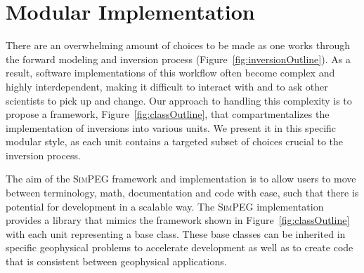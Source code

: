 \documentclass[preprint,review,3p,times,onecolumn,authoryear]{elsarticle}
\newcommand{\SimPEG}{\textsc{SimPEG}\xspace}
\begin{document}

\section{Modular Implementation}
\label{sec:implementation}

There are an overwhelming amount of choices to be made as one works through the forward
modeling and inversion process (Figure~\ref{fig:inversionOutline}). As a result,
software implementations of this workflow often become
complex and highly interdependent, making it difficult to interact with and to
ask other scientists to pick up and change.
Our approach to handling this complexity is to propose a framework,
Figure~\ref{fig:classOutline}, that compartmentalizes the implementation of
inversions into various units.
We present it in this specific modular style, as each unit contains
a targeted subset of choices crucial to the inversion process.

The aim of the \SimPEG framework and implementation
is to
allow users to move between terminology, math, documentation and
code with ease, such that there is potential for development in a scalable way.
The \SimPEG implementation provides a library that mimics the framework shown in Figure~\ref{fig:classOutline} with each unit representing a base class.
These base classes can be inherited in specific geophysical problems to accelerate development
as well as to create code that is consistent between geophysical applications.


\end{document}
